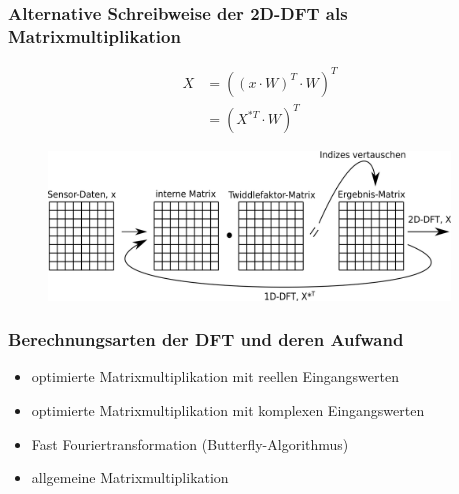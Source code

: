 \begin{frame}\frametitle{Alternative Schreibweise der 2D-DFT als Matrixmultiplikation}
 \begin{align*}
 X &= \left(\left(x\cdot W\right)^T\cdot W\right)^T \label{eq:MatMultTranspose}\\
   &= \left(X^{*T} \cdot W\right)^T \nonumber
\end{align*}
 \begin{figure}[htbp]
 \centering
 \includegraphics[width=0.95\textwidth]{img/MatMultTranspose2.png}
\end{figure}
\end{frame}


\begin{frame}\frametitle{Berechnungsarten der DFT und deren Aufwand}
 \begin{itemize}
  \item optimierte Matrixmultiplikation mit reellen Eingangswerten
  \item optimierte Matrixmultiplikation mit komplexen Eingangswerten
  \item Fast Fouriertransformation (Butterfly-Algorithmus)
  \item allgemeine Matrixmultiplikation
 \end{itemize}
\end{frame}


